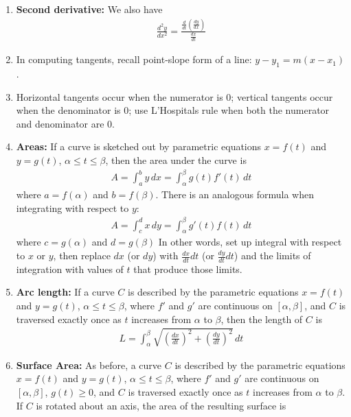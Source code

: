 \documentclass[10pt]{article}
\begin{document}
\begin{multicols*}{2}
\begin{enumerate}
\begin{enumerate}
        \item \textbf{Second derivative:} We also have
        \begin{align*}
            \frac{d^2y}{dx^2} = \frac{\frac{d}{dt}(\frac{dy}{dx})}{\frac{dx}{dt}}
        \end{align*}
        \item In computing tangents, recall point-slope form of a line: $y - y_1 = m(x - x_1)$.  
        \item Horizontal tangents occur when the numerator is 0; vertical tangents occur when the denominator is 0; use L'Hospitals rule when both the numerator and denominator are 0.
        
        \item \textbf{Areas:} If a curve is sketched out by parametric equations $x = f(t)$ and $y = g(t)$, $\alpha \leq t \leq \beta$, then the area under the curve is 
        \begin{align*}
            A = \int_a^b y \, dx = \int_\alpha^\beta g(t) f'(t) \, dt
        \end{align*}
        where $a = f(\alpha)$ and $b = f(\beta)$. There is an analogous formula when integrating with respect to $y$:
        \begin{align*}
            A = \int_c^d x \, dy = \int_\alpha^\beta g'(t) f(t) \, dt
        \end{align*}
        where $c = g(\alpha)$ and $d = g(\beta)$ In other words, set up integral with respect to $x$ or $y$, then replace $dx$ (or $dy$) with $\frac{dx}{dt}dt$ (or $\frac{dy}{dt}dt$) and the limits of integration with values of $t$ that produce those limits.
        \item \textbf{Arc length:} If a curve $C$ is described by the parametric equations $x = f(t)$ and $y = g(t)$, $\alpha \leq t \leq \beta$, where $f'$ and $g'$ are continuous on $[\alpha, \beta]$, and $C$ is traversed exactly once as $t$ increases from $\alpha$ to $\beta$, then the length of $C$ is 
        \begin{align*}
            L = \int_\alpha^\beta \sqrt{ \left(\frac{dx}{dt}\right)^2 + \left(\frac{dy}{dt}\right)^2} \, dt
        \end{align*}
        \item \textbf{Surface Area:} As before, a curve $C$ is described by the parametric equations $x = f(t)$ and $y = g(t)$, $\alpha \leq t \leq \beta$, where $f'$ and $g'$ are continuous on $[\alpha, \beta]$, $g(t) \geq 0$, and $C$ is traversed exactly once as $t$ increases from $\alpha$ to $\beta$. If $C$ is rotated about an axis, the area of the resulting surface is         \begin{align*}

\end{align*}
\end{enumerate}
\end{enumerate}
\end{multicols*}
\end{document}
